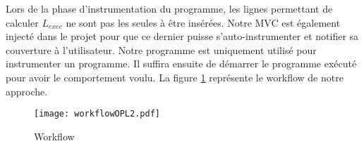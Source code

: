 Lors de la phase d'instrumentation du programme, les lignes permettant de calculer $L_{exec}$ ne sont pas les seules à être insérées. Notre MVC est également injecté dans le projet pour que ce dernier puisse s'auto-instrumenter et notifier sa couverture à l'utilisateur. Notre programme est uniquement utilisé pour instrumenter un programme. Il suffira ensuite de démarrer le programme exécuté pour avoir le comportement voulu. La figure \ref{workflow} représente le workflow de notre approche. 

\begin{figure}[h]
\centering
\texttt{[image: workflowOPL2.pdf]}

\caption{Workflow}
\label{workflow}
\end{figure}


